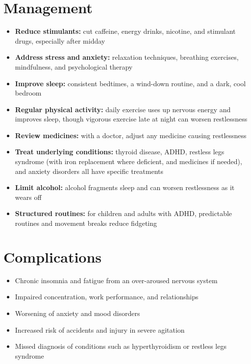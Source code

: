 \section*{Management}
\begin{itemize}
    \item \textbf{Reduce stimulants:} cut caffeine, energy drinks, nicotine, and stimulant drugs, especially after midday
    \item \textbf{Address stress and anxiety:} relaxation techniques, breathing exercises, mindfulness, and psychological therapy
    \item \textbf{Improve sleep:} consistent bedtimes, a wind-down routine, and a dark, cool bedroom
    \item \textbf{Regular physical activity:} daily exercise uses up nervous energy and improves sleep, though vigorous exercise late at night can worsen restlessness
    \item \textbf{Review medicines:} with a doctor, adjust any medicine causing restlessness
    \item \textbf{Treat underlying conditions:} thyroid disease, ADHD, restless legs syndrome (with iron replacement where deficient, and medicines if needed), and anxiety disorders all have specific treatments
    \item \textbf{Limit alcohol:} alcohol fragments sleep and can worsen restlessness as it wears off
    \item \textbf{Structured routines:} for children and adults with ADHD, predictable routines and movement breaks reduce fidgeting
\end{itemize}

\section*{Complications}
\begin{itemize}
    \item Chronic insomnia and fatigue from an over-aroused nervous system
    \item Impaired concentration, work performance, and relationships
    \item Worsening of anxiety and mood disorders
    \item Increased risk of accidents and injury in severe agitation
    \item Missed diagnosis of conditions such as hyperthyroidism or restless legs syndrome
\end{itemize}

